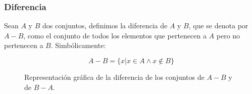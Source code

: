 \subsubsection{Diferencia}

Sean $A$ y $B$ dos conjuntos, definimos la diferencia de $A$ y $B$, que se
denota por $A-B$, como el conjunto de todos los elementos que pertenecen a $A$
pero no pertenecen a $B$. Simbólicamente:

\begin{equation}
    A-B = \{x | x \in A \land x \not\in B\}
\end{equation}

\begin{figure}[h]
    \centering
    \begin{subfigure}[b]{0.45\textwidth}
        \centering
    \end{subfigure}
\hfill
    \begin{subfigure}[b]{0.45\textwidth}
        \centering
\end{subfigure}
\caption{Representación gráfica de la diferencia de los conjuntos de $A-B$ y de $B-A$.}
\label{fig:diferenciaConjuntos}
\end{figure}

